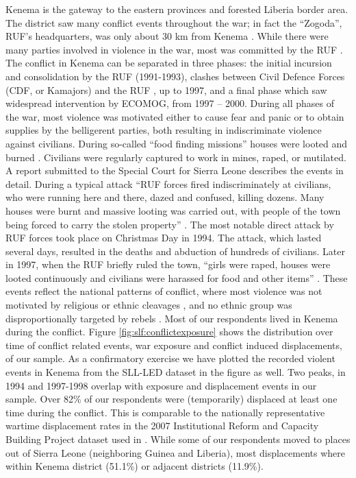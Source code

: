Kenema is the gateway to the eastern provinces and forested Liberia border area. The district saw many conflict events throughout the war; in fact the “Zogoda”, RUF’s headquarters, was only about 30 km from Kenema \citep{Peters2011}. While there were many parties involved in violence in the war, most was committed by the RUF \citep{Conibere2004}.  The conflict in Kenema can be separated in three phases: the initial incursion and consolidation by the RUF (1991-1993), clashes between Civil Defence Forces (CDF, or Kamajors) and the RUF , up to 1997, and a final phase which saw widespread intervention by ECOMOG, from 1997 – 2000. During all phases of the war, most violence was motivated either to cause fear and panic or to obtain supplies by the belligerent parties, both resulting in indiscriminate violence against civilians. During so-called “food finding missions” houses were looted and burned \citep[for a broader discussion on such tactics, refer to Kalyvas ][]{Kalyvas2006}. Civilians were regularly captured to work in mines, raped, or mutilated. A report submitted to the Special Court for Sierra Leone \citep{Smith2004a} describes the events in detail. During a typical attack “RUF forces fired indiscriminately at civilians, who were running here and there, dazed and confused, killing dozens. Many houses were burnt and massive looting was carried out, with people of the town being forced to carry the stolen property” \citep[p.~303]{Smith2004a}. The most notable direct attack by RUF forces took place on Christmas Day in 1994. The attack, which lasted several days, resulted in the deaths and abduction of hundreds of civilians. Later in 1997, when the RUF briefly ruled the town, “girls were raped, houses were looted continuously and civilians were harassed for food and other items” \citep[p.~318]{Smith2004a}. These events reflect the national patterns of conflict, where most violence was not motivated by religious or ethnic cleavages \citep[see][]{Bellows2009b}, and no ethnic group was disproportionally targeted by rebels \citep{Conibere2004,Humphreys2006}. 
Most of our respondents lived in Kenema during the conflict. Figure \ref{fig:slf:conflictexposure} shows the distribution over time of conflict related events, war exposure and conflict induced displacements, of our sample. As a confirmatory exercise we have plotted the recorded violent events in Kenema from the SLL-LED dataset \citep{Bruijne2014} in the figure as well. Two peaks, in 1994 and 1997-1998 overlap with exposure and displacement events in our sample. Over 82\% of our respondents were (temporarily) displaced at least one time during the conflict. This is comparable to the nationally representative wartime displacement rates in the 2007 Institutional Reform and Capacity Building Project dataset  used in \cite{Bellows2009b}. While some of our respondents moved to places out of Sierra Leone (neighboring Guinea and Liberia), most displacements where within Kenema district (51.1\%) or adjacent districts (11.9\%). 


